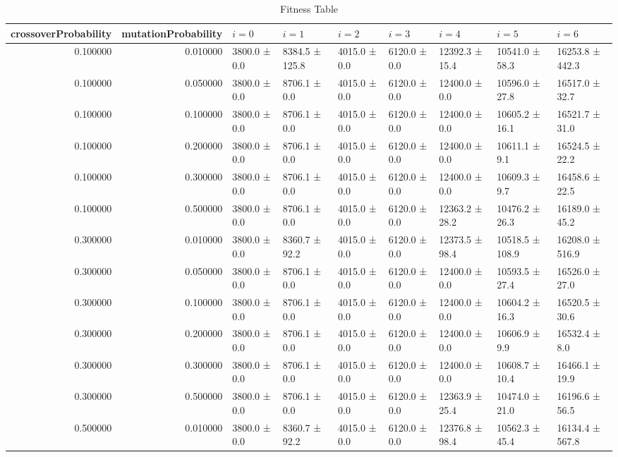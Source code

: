 \begin{table}
\caption{Fitness Table}
\label{tab:fitness_table}
\begin{tabular}{rrlllllll}
\toprule
crossoverProbability & mutationProbability & \(i = 0\) & \(i = 1\) & \(i = 2\) & \(i = 3\) & \(i = 4\) & \(i = 5\) & \(i = 6\) \\
\midrule
0.100000 & 0.010000 & 3800.0 ± 0.0 & 8384.5 ± 125.8 & 4015.0 ± 0.0 & 6120.0 ± 0.0 & 12392.3 ± 15.4 & 10541.0 ± 58.3 & 16253.8 ± 442.3 \\
0.100000 & 0.050000 & 3800.0 ± 0.0 & 8706.1 ± 0.0 & 4015.0 ± 0.0 & 6120.0 ± 0.0 & 12400.0 ± 0.0 & 10596.0 ± 27.8 & 16517.0 ± 32.7 \\
0.100000 & 0.100000 & 3800.0 ± 0.0 & 8706.1 ± 0.0 & 4015.0 ± 0.0 & 6120.0 ± 0.0 & 12400.0 ± 0.0 & 10605.2 ± 16.1 & 16521.7 ± 31.0 \\
0.100000 & 0.200000 & 3800.0 ± 0.0 & 8706.1 ± 0.0 & 4015.0 ± 0.0 & 6120.0 ± 0.0 & 12400.0 ± 0.0 & 10611.1 ± 9.1 & 16524.5 ± 22.2 \\
0.100000 & 0.300000 & 3800.0 ± 0.0 & 8706.1 ± 0.0 & 4015.0 ± 0.0 & 6120.0 ± 0.0 & 12400.0 ± 0.0 & 10609.3 ± 9.7 & 16458.6 ± 22.5 \\
0.100000 & 0.500000 & 3800.0 ± 0.0 & 8706.1 ± 0.0 & 4015.0 ± 0.0 & 6120.0 ± 0.0 & 12363.2 ± 28.2 & 10476.2 ± 26.3 & 16189.0 ± 45.2 \\
0.300000 & 0.010000 & 3800.0 ± 0.0 & 8360.7 ± 92.2 & 4015.0 ± 0.0 & 6120.0 ± 0.0 & 12373.5 ± 98.4 & 10518.5 ± 108.9 & 16208.0 ± 516.9 \\
0.300000 & 0.050000 & 3800.0 ± 0.0 & 8706.1 ± 0.0 & 4015.0 ± 0.0 & 6120.0 ± 0.0 & 12400.0 ± 0.0 & 10593.5 ± 27.4 & 16526.0 ± 27.0 \\
0.300000 & 0.100000 & 3800.0 ± 0.0 & 8706.1 ± 0.0 & 4015.0 ± 0.0 & 6120.0 ± 0.0 & 12400.0 ± 0.0 & 10604.2 ± 16.3 & 16520.5 ± 30.6 \\
0.300000 & 0.200000 & 3800.0 ± 0.0 & 8706.1 ± 0.0 & 4015.0 ± 0.0 & 6120.0 ± 0.0 & 12400.0 ± 0.0 & 10606.9 ± 9.9 & 16532.4 ± 8.0 \\
0.300000 & 0.300000 & 3800.0 ± 0.0 & 8706.1 ± 0.0 & 4015.0 ± 0.0 & 6120.0 ± 0.0 & 12400.0 ± 0.0 & 10608.7 ± 10.4 & 16466.1 ± 19.9 \\
0.300000 & 0.500000 & 3800.0 ± 0.0 & 8706.1 ± 0.0 & 4015.0 ± 0.0 & 6120.0 ± 0.0 & 12363.9 ± 25.4 & 10474.0 ± 21.0 & 16196.6 ± 56.5 \\
0.500000 & 0.010000 & 3800.0 ± 0.0 & 8360.7 ± 92.2 & 4015.0 ± 0.0 & 6120.0 ± 0.0 & 12376.8 ± 98.4 & 10562.3 ± 45.4 & 16134.4 ± 567.8 \\

\end{tabular}
\end{table}
